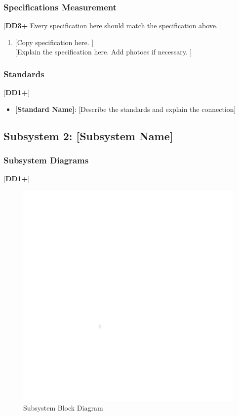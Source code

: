 \documentclass[letterpaper, 11pt]{article}
\begin{document}
\subsubsection{Specifications Measurement}
[\textbf{DD3+} Every specification here should match the specification above. ]
\begin{enumerate}
    \item {[Copy specification here. ]} \\
          {[Explain the specification here. Add photoes if necessary. ]}
\end{enumerate}

\subsubsection{Standards}
[\textbf{DD1+}]
\begin{itemize}
    \item \textbf{[Standard Name]}: [Describe the standards and explain the connection]
\end{itemize}

\clearpage
\subsection{Subsystem 2: [Subsystem Name]}

\subsubsection{Subsystem Diagrams}
[\textbf{DD1+}]
\begin{figure}[h]
    \centering
    \includegraphics[width=16cm]{white.png} %
    \caption{Subsystem Block Diagram}
\end{figure} %
\end{document}
